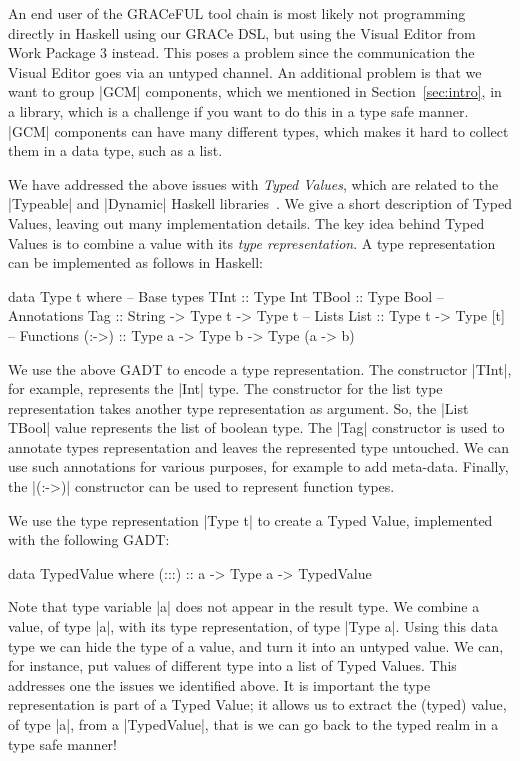 \documentclass{article}
\begin{document}
An end user of the GRACeFUL tool chain is most likely not programming directly
in Haskell using our GRACe DSL, but using the Visual Editor from Work Package 3
instead. This poses a problem since the communication the Visual Editor goes via
an untyped channel. An additional problem is that we want to group |GCM|
components, which we mentioned in Section~\ref{sec:intro}, in a library, which
is a challenge if you want to do this in a type safe manner. |GCM| components can
have many different types, which makes it hard to collect them in a data type,
such as a list.

We have addressed the above issues with \emph{Typed Values}, which are related
to the |Typeable| and |Dynamic| Haskell libraries~\cite{DataDynamic}. We give a
short description of Typed Values, leaving out many implementation details. The
key idea behind Typed Values is to combine a value with its \emph{type
representation}. A type representation can be implemented as follows in Haskell:
\begin{haskellcode}
data Type t where
  -- Base types
  TInt   :: Type Int
  TBool  :: Type Bool
  -- Annotations
  Tag   :: String -> Type t -> Type t
  -- Lists
  List  :: Type t -> Type [t]
  -- Functions
  (:->) :: Type a -> Type b -> Type (a -> b)
\end{haskellcode}
We use the above GADT to encode a type representation. The constructor |TInt|,
for example, represents the |Int| type. The constructor for the list type
representation takes another type representation as argument. So, the |List TBool| 
value represents the list of boolean type. The |Tag| constructor is used
to annotate types representation and leaves the represented type untouched. We
can use such annotations for various purposes, for example to add meta-data.
Finally, the |(:->)| constructor can be used to represent function types. 

We use the type representation |Type t| to create a Typed Value, implemented
with the following GADT:
\begin{haskellcode}
data TypedValue where
  (:::) :: a -> Type a -> TypedValue
\end{haskellcode}
Note that type variable |a| does not appear in the result type. We combine a
value, of type |a|, with its type representation, of type |Type a|. Using this
data type we can hide the type of a value, and turn it into an untyped value. 
We can, for instance, put values of different type into a list of Typed Values.
This addresses one the issues we identified above. It is important the type 
representation is part of a Typed Value; it allows us to extract the (typed)
value, of type |a|, from a |TypedValue|, that is we can go back to the typed 
realm in a type safe manner! 
\end{document}
